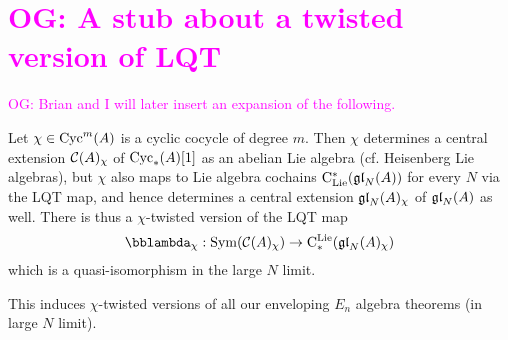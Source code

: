 \documentclass[11pt]{amsart}
\numberwithin{equation}{section}
\def\brian{\textcolor{blue}{BW: }\textcolor{blue}}
\def\owen{\textcolor{magenta}{OG: }\textcolor{magenta}}
\begin{document}
\section{\owen{A stub about a twisted version of LQT}}

\owen{Brian and I will later insert an expansion of the following.}

Let $\chi \in {\rm Cyc}^m(A)$ is a cyclic cocycle of degree $m$. 
Then $\chi$ determines a central extension $\mathcal C(A)_\chi$ of ${\rm Cyc}_*(A)[1]$ as an abelian Lie algebra (cf. Heisenberg Lie algebras),
but $\chi$ also maps to Lie algebra cochains ${\rm C}_{\rm Lie}^*(\frak{gl}_N(A))$ for every $N$ via the LQT map,
and hence determines a central extension $\frak{gl}_N(A)_\chi$ of $\frak{gl}_N(A)$ as well.
There is thus a $\chi$-twisted version of the LQT map
\[
\lqt_\chi: \Sym(\cC(A)_\chi) \to \cliels(\gl_N(A)_\chi)
\]
which is a quasi-isomorphism in the large $N$ limit.

This induces $\chi$-twisted versions of all our enveloping $E_n$ algebra theorems (in large $N$ limit).

%



  


\end{document}
